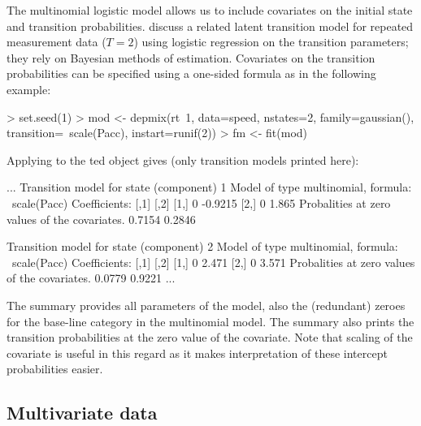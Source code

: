 \documentclass[article]{jss}
\begin{document}
The multinomial logistic model allows us to include covariates on the
initial state and transition probabilities.  \citet{Chung2007} discuss
a related latent transition model for repeated measurement data
($T=2$) using logistic regression on the transition parameters; they
rely on Bayesian methods of estimation.  Covariates on the transition
probabilities can be specified using a one-sided formula as in the
following example:
\begin{CodeChunk}
\begin{CodeInput}
> set.seed(1)
> mod <- depmix(rt~1, data=speed, nstates=2, family=gaussian(), 
    transition=~scale(Pacc), instart=runif(2))
> fm <- fit(mod)
\end{CodeInput}
\end{CodeChunk}

Applying  to the ted object gives (only transition models
printed here): 
\begin{CodeChunk}
\begin{CodeOutput}
...
Transition model for state (component) 1 
Model of type multinomial, formula: ~scale(Pacc)
Coefficients: 
     [,1]       [,2]
[1,]    0 -0.9215
[2,]    0  1.865
Probalities at zero values of the covariates.
0.7154 0.2846

Transition model for state (component) 2 
Model of type multinomial, formula: ~scale(Pacc)
Coefficients: 
     [,1]     [,2]
[1,]    0 2.471
[2,]    0 3.571
Probalities at zero values of the covariates.
0.0779 0.9221
...
\end{CodeOutput}
\end{CodeChunk}
The summary provides all parameters of the model, also the (redundant)
zeroes for the base-line category in the multinomial model.  The
summary also prints the transition probabilities at the zero value of
the covariate.  Note that scaling of the covariate is useful in this
regard as it makes interpretation of these intercept probabilities
easier.

\subsection{Multivariate data}
\end{document}
